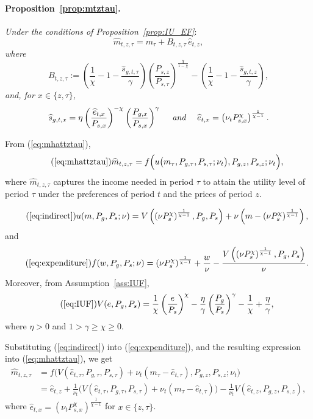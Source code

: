 \documentclass[12pt,a4paper]{article}
\begin{document}
\begin{appendices}
\paragraph{Proposition~\ref{prop:mtztau}.}
{\it Under the conditions of Proposition~\ref{prop:IU_EF}}:
\[
\widehat{m}_{t,z,\tau} = m_{\tau} + B_{t,z,\tau} \,  \widehat e_{t,z},
\]
{\it where}
\[
B_{t,z,\tau} :=  \left(\frac{1}{\chi} - 1 - \frac{\widehat{s}_{g,t,\tau}}{\gamma} \right)  \left( \frac{P_{s,z}}{P_{s,\tau}} \right)^{\frac{\chi}{1 - \chi}} - \left(\frac{1}{\chi} - 1 - \frac{\widehat{s}_{g,t,z}}{\gamma} \right) ,
\]
{\it and, for $x\in\{z,\tau\}$,}
\[
\widehat s_{g,t,x}  = \eta \left( \frac{\widehat e_{t,x}}{P_{s,x}} \right)^{-\chi} \left( \frac{P_{g,x}}{P_{s,x}} \right)^\gamma 
\ \ \ \ \text{\it and}\ \ \ \ 
 \widehat e_{t,x} = \left( \nu_t P_{s,x}^\chi \right)^{\frac{1}{\chi - 1}}  .
 \]

From (\ref{eq:mhattztau}),
\[\tag{\ref{eq:mhattztau}}
\widehat{m}_{t,z,\tau} = f\Big( u\big(m_{\tau}, P_{g,\tau}, P_{s,\tau}; \nu_t \big), P_{g,z}, P_{s,z}; \nu_t \Big),
\]
where $\widehat{m}_{t,z,\tau}$ captures the income needed in period $\tau$ to attain the utility level of period $\tau$ under the preferences of period $t$ and the prices of period $z$.

\begin{equation}\tag{\ref{eq:indirect}}
u(m, P_{g}, P_{s}; \nu) = 
V\left( \left( \nu P_{s}^\chi \right)^{\frac{1}{\chi - 1}}, P_{g}, P_{s} \right)
+ \nu \left( m - \left( \nu P_{s}^\chi \right)^{\frac{1}{\chi - 1}} \right),
\end{equation}
and
\begin{equation}\tag{\ref{eq:expenditure}}
f(w, P_{g}, P_{s}; \nu) = 
\left( \nu P_{s}^\chi \right)^{\frac{1}{\chi - 1}} 
+ \frac{w}{\nu}
- \frac{ V\left( \left( \nu P_{s}^\chi \right)^{\frac{1}{\chi - 1}}, P_{g}, P_{s} \right) }{\nu}.
\end{equation}
Moreover, from Assumption~\ref{ass:IUF}, 
\begin{equation}\tag{\ref{eq:IUF}}
V(e, P_{g}, P_{s}) = \frac{1}{\chi} \left( \frac{e}{P_{s}} \right)^\chi 
- \frac{\eta}{\gamma} \left( \frac{P_{g}}{P_{s}} \right)^\gamma 
- \frac{1}{\chi} + \frac{\eta}{\gamma},
\end{equation}
where \( \eta > 0 \) and \( 1 > \gamma \geq \chi \geq 0 \).

\noindent Substituting (\ref{eq:indirect}) into (\ref{eq:expenditure}), and the resulting expression into (\ref{eq:mhattztau}), we get
\[
\begin{aligned}
\widehat{m}_{t,z,\tau} &= f\Big( V(\widehat{e}_{t,\tau}, P_{g,\tau}, P_{s,\tau}) + \nu_t (m_{\tau} - \widehat{e}_{t,\tau}), P_{g,z}, P_{s,z}; \nu_t \Big) \\
&= \widehat e_{t,z} + \frac{1}{\nu_t} \Big( V(\widehat{e}_{t,\tau}, P_{g,\tau}, P_{s,\tau}) + \nu_t (m_{\tau} - \widehat{e}_{t,\tau})\Big) - 
\frac{1}{\nu_t} V( \widehat e_{t,z}, P_{g,z}, P_{s,z}),
\end{aligned}
\]
where \( \widehat e_{t,x} = \left( \nu_t P_{s,x}^\chi \right)^{\frac{1}{\chi - 1}} \) for $x\in\{z,\tau\}$.


\end{appendices}
\end{document}
